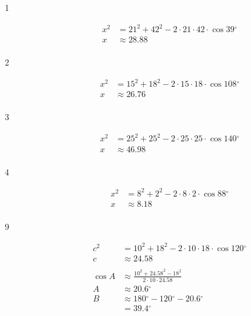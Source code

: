 \documentclass{exam}
\newcommand{\dg}{\ensuremath{^\circ}}
\begin{document}
    \begin{description}

      \item[1] 
        \begin{align*}
          x^2 & = 21^2 + 42^2 - 2 \cdot 21 \cdot 42 \cdot \cos 39 \dg \\
          x   & \approx \boxed{ 28.88 } \\
        \end{align*}

      \item[2] 
        \begin{align*}
          x^2 & = 15^2 + 18^2 - 2 \cdot 15 \cdot 18 \cdot \cos 108 \dg \\
          x   & \approx \boxed{ 26.76 } \\
        \end{align*}

      \item[3] 
        \begin{align*}
          x^2 & = 25^2 + 25^2 - 2 \cdot 25 \cdot 25 \cdot \cos 140 \dg \\
          x   & \approx \boxed{ 46.98 } \\
        \end{align*}

      \item[4] 
        \begin{align*}
          x^2 & = 8^2 + 2^2 - 2 \cdot 8 \cdot 2 \cdot \cos 88 \dg \\
          x   & \approx \boxed{ 8.18 } \\
        \end{align*}

      \item[9] 
        \begin{align*}
          c^2 & = 10^2 + 18^2 - 2 \cdot 10 \cdot 18 \cdot \cos 120 \dg \\
          c   & \approx \boxed{ 24.58 } \\
          \\
          \cos A & \approx \frac{ 10^2 + 24.58^2 - 18^2}{2 \cdot 10 \cdot 24.58} \\
          A      & \approx \boxed{ 20.6 \dg }
          \\
          B & \approx 180 \dg - 120 \dg - 20.6 \dg \\
            & = \boxed{ 39.4 \dg } \\
        \end{align*}


\end{description}
\end{document}

